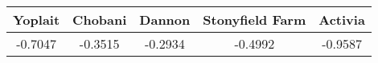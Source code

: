 \begin{tabular}{ccccc}
\hline
Yoplait & Chobani & Dannon & Stonyfield Farm & Activia \\
\hline
-0.7047 & -0.3515 & -0.2934 & -0.4992 & -0.9587 \\
\hline
\end{tabular}